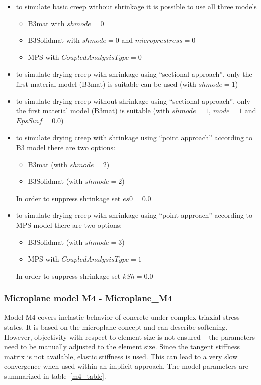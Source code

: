 \documentclass[a4paper]{article}
\begin{document}
\begin {itemize}
\item to simulate basic creep without shrinkage it is possible to use
  all three models
\begin {itemize}%
\item B3mat with $shmode = 0$
\item B3Solidmat with $shmode = 0$ and $microprestress = 0$
\item MPS with $CoupledAnalysisType = 0$
\end{itemize}
\item to simulate drying creep with shrinkage using ``sectional approach'', only the
  first material model (B3mat) is suitable can be used (with $shmode = 1$)

\item to simulate drying creep without shrinkage using ``sectional approach'', only the
  first material model (B3mat) is suitable (with $shmode = 1$, $mode = 1$
  and $EpsSinf = 0.0$)

\item to simulate drying creep with shrinkage using ``point approach''
  according to B3 model there are two options:
\begin {itemize} %
\item B3mat (with $shmode = 2$)
\item B3Solidmat (with $shmode = 2$)
\end{itemize}
In order to suppress shrinkage set $es0 = 0.0$

\item to simulate drying creep with shrinkage using ``point approach''
  according to MPS model there are two options:
\begin {itemize} %
\item B3Solidmat (with $shmode = 3$)
\item MPS with $CoupledAnalysisType = 1$
\end{itemize}
In order to suppress shrinkage set $kSh = 0.0$
\end{itemize}


\clearpage


\subsubsection{Microplane model M4 - Microplane\_M4}
Model M4 covers inelastic behavior of concrete under complex
triaxial stress states. It is based on the microplane concept and
can describe softening. However, 
objectivity with respect
to element size is not ensured -- the parameters need to be manually adjusted
to the element size. Since the tangent stiffness matrix is not available, 
elastic stiffness is used. This can lead to a very slow convergence 
when used within an implicit approach.
The model parameters are summarized
in table~\ref{m4_table}.
\end{document}

